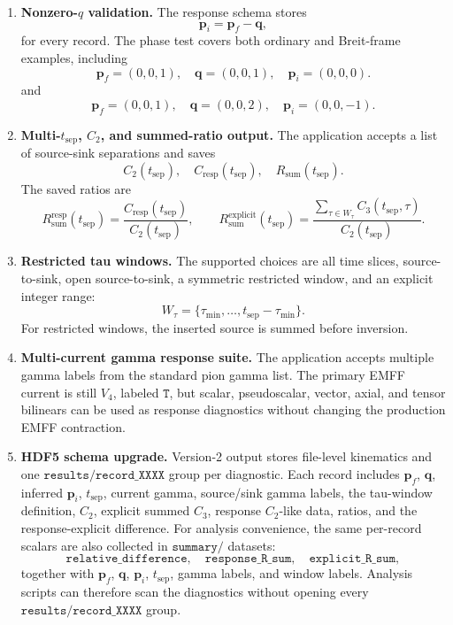 \documentclass[11pt,a4paper]{article}
\newcommand{\Ctwo}{C_2}
\newcommand{\Cthree}{C_3}
\newcommand{\Cresp}{C_{\mathrm{resp}}}
\newcommand{\Rsum}{R_{\mathrm{sum}}}
\begin{document}
\begin{enumerate}[label=\arabic*.]
  \item \textbf{Nonzero-\(q\) validation.}
  The response schema stores
  \[
    \mathbf p_i = \mathbf p_f - \mathbf q,
  \]
  for every record.  The phase test covers both ordinary and Breit-frame
  examples, including
  \[
    \mathbf p_f=(0,0,1),\quad
    \mathbf q=(0,0,1),\quad
    \mathbf p_i=(0,0,0).
  \]
  and
  \[
    \mathbf p_f=(0,0,1),\quad
    \mathbf q=(0,0,2),\quad
    \mathbf p_i=(0,0,-1).
  \]

  \item \textbf{Multi-\(t_{\mathrm{sep}}\), \(C_2\), and summed-ratio output.}
  The application accepts a list of source-sink separations and saves
  \[
    \Ctwo(t_{\mathrm{sep}}),\quad
    \Cresp(t_{\mathrm{sep}}),\quad
    \Rsum(t_{\mathrm{sep}}).
  \]
  The saved ratios are
  \begin{equation}
    \Rsum^{\mathrm{resp}}(t_{\mathrm{sep}})
      =
      \frac{\Cresp(t_{\mathrm{sep}})}
           {\Ctwo(t_{\mathrm{sep}})},
    \qquad
    \Rsum^{\mathrm{explicit}}(t_{\mathrm{sep}})
      =
      \frac{\sum_{\tau\in W_\tau}\Cthree(t_{\mathrm{sep}},\tau)}
           {\Ctwo(t_{\mathrm{sep}})}.
  \end{equation}

  \item \textbf{Restricted tau windows.}
  The supported choices are all time slices, source-to-sink,
  open source-to-sink, a symmetric restricted window, and an explicit
  integer range:
  \[
    W_\tau=\{\tau_{\min},\ldots,t_{\mathrm{sep}}-\tau_{\min}\}.
  \]
  For restricted windows, the inserted source is summed before inversion.

  \item \textbf{Multi-current gamma response suite.}
  The application accepts multiple gamma labels from the standard pion gamma
  list.  The primary EMFF current is still \(V_4\), labeled \(\texttt{T}\),
  but scalar, pseudoscalar, vector, axial, and tensor bilinears can be used as
  response diagnostics without changing the production EMFF contraction.

  \item \textbf{HDF5 schema upgrade.}
  Version-2 output stores file-level kinematics and one
  \(\texttt{results/record\_XXXX}\) group per diagnostic.  Each record includes
  \(\mathbf p_f\), \(\mathbf q\), inferred \(\mathbf p_i\), \(t_{\mathrm{sep}}\),
  current gamma, source/sink gamma labels, the tau-window definition, \(C_2\),
  explicit summed \(C_3\), response \(C_2\)-like data, ratios, and the
  response-explicit difference.
  For analysis convenience, the same per-record scalars are also collected in
  \(\texttt{summary/}\) datasets:
  \[
    \texttt{relative\_difference},\quad
    \texttt{response\_R\_sum},\quad
    \texttt{explicit\_R\_sum},
  \]
  together with \(\mathbf p_f\), \(\mathbf q\), \(\mathbf p_i\),
  \(t_{\mathrm{sep}}\), gamma labels, and window labels.  Analysis scripts can
  therefore scan the diagnostics without opening every
  \(\texttt{results/record\_XXXX}\) group.


\end{enumerate}
\end{document}
